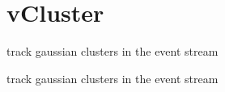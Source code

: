 \hypertarget{group__vCluster}{\section{v\-Cluster}
\label{group__vCluster}
}


track gaussian clusters in the event stream  


track gaussian clusters in the event stream 